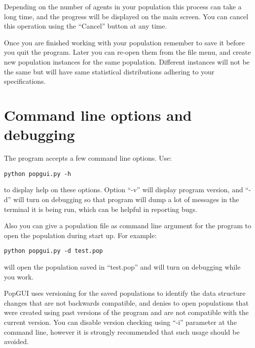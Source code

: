 \documentclass{article}
\begin{document}
Depending on the number of agents in your population this process can take a long time, and the progress will be displayed on the main screen. You can cancel this operation using the ``Cancel'' button at any time.

Once you are finished working with your population remember to save it before you quit the program. Later you can re-open them from the file menu, and create new population instances for the same population. Different instances will not be the same but will have same statistical distributions adhering to your specifications.

\section{Command line options and debugging}
\label{sec:cmdline}
The program accepts a few command line options. Use:
\begin{verbatim}
python popgui.py -h
\end{verbatim}
to display help on these options. Option ``-v'' will display program version, and ``-d'' will turn on debugging so that program will dump a lot of messages in the terminal it is being run, which can be helpful in reporting bugs. 

Also you can give a population file as command line argument for the program to open the population during start up. For example:
\begin{verbatim}
python popgui.py -d test.pop
\end{verbatim}
will open the population saved in ``test.pop'' and will turn on debugging while you work.

PopGUI uses versioning for the saved populations to identify the data structure changes that are not backwards compatible, and denies to open populations that were created using past versions of the program and are not compatible with the current version. You can disable version checking using ``-i'' parameter at the command line, however it is strongly recommended that such usage should be avoided.
\end{document}
